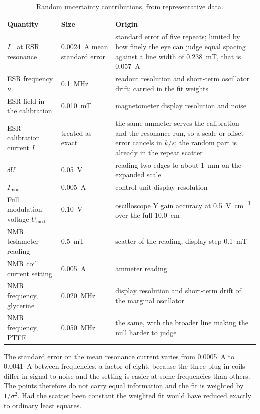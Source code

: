 \documentclass[11pt,a4paper]{article}
\begin{document}
\begin{table}[htbp]
\centering
\caption{Random uncertainty contributions, from representative data.}
\label{tab:random}
\footnotesize
\begin{tabular}{@{}L{3.2cm}L{2.6cm}L{9.8cm}@{}}
\toprule
Quantity & Size & Origin \\
\midrule
$I_=$ at ESR resonance & \SI{0.0024}{\ampere} mean standard error & standard error of five repeats; limited by how finely the eye can judge equal spacing against a line width of \SI{0.238}{\milli\tesla}, that is \SI{0.057}{\ampere} \\
ESR frequency $\nu$ & \SI{0.1}{\mega\hertz} & readout resolution and short-term oscillator drift; carried in the fit weights \\
ESR field in the calibration & \SI{0.010}{\milli\tesla} & magnetometer display resolution and noise \\
ESR calibration current $I_=$ & treated as exact & the same ammeter serves the calibration and the resonance run, so a scale or offset error cancels in $k/s$; the random part is already in the repeat scatter \\
$\delta U$ & \SI{0.05}{\volt} & reading two edges to about \SI{1}{\milli\metre} on the expanded scale \\
$I_{\mathrm{mod}}$ & \SI{0.005}{\ampere} & control unit display resolution \\
Full modulation voltage $U_{\mathrm{mod}}$ & \SI{0.10}{\volt} & oscilloscope Y gain accuracy at \SI{0.5}{\volt\per\centi\metre} over the full \SI{10.0}{\centi\metre} \\
NMR teslameter reading & \SI{0.5}{\milli\tesla} & scatter of the reading, display step \SI{0.1}{\milli\tesla} \\
NMR coil current setting & \SI{0.005}{\ampere} & ammeter reading \\
NMR frequency, glycerine & \SI{0.020}{\mega\hertz} & display resolution and short-term drift of the marginal oscillator \\
NMR frequency, PTFE & \SI{0.050}{\mega\hertz} & the same, with the broader line making the null harder to judge \\
\bottomrule
\end{tabular}
\end{table}

The standard error on the mean resonance current varies from \SI{0.0005}{\ampere} to
\SI{0.0041}{\ampere} between frequencies, a factor of eight, because the three plug-in coils
differ in signal-to-noise and the setting is easier at some frequencies than others. The points
therefore do not carry equal information and the fit is weighted by $1/\sigma^{2}$. Had the
scatter been constant the weighted fit would have reduced exactly to ordinary least squares.
\end{document}

